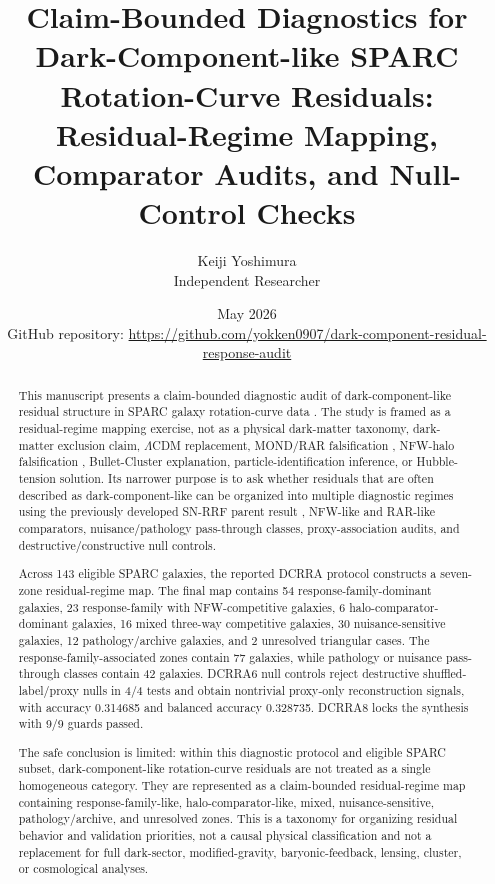 \documentclass[11pt,a4paper]{article}
\title{Claim-Bounded Diagnostics for Dark-Component-like SPARC Rotation-Curve Residuals:\\
Residual-Regime Mapping, Comparator Audits, and Null-Control Checks}
\author{Keiji Yoshimura\\Independent Researcher}
\date{May 2026\\\vspace{0.5em}\small GitHub repository: \url{https://github.com/yokken0907/dark-component-residual-response-audit}}
\begin{document}
\maketitle

\begin{abstract}
This manuscript presents a claim-bounded diagnostic audit of dark-component-like residual structure in SPARC galaxy rotation-curve data \cite{lelli2016}. The study is framed as a residual-regime mapping exercise, not as a physical dark-matter taxonomy, dark-matter exclusion claim, $\Lambda$CDM replacement, MOND/RAR falsification \cite{milgrom1983,mcgaugh2016}, NFW-halo falsification \cite{nfw1997}, Bullet-Cluster explanation, particle-identification inference, or Hubble-tension solution. Its narrower purpose is to ask whether residuals that are often described as dark-component-like can be organized into multiple diagnostic regimes using the previously developed SN-RRF parent result \cite{yoshimura2026snrrf}, NFW-like and RAR-like comparators, nuisance/pathology pass-through classes, proxy-association audits, and destructive/constructive null controls.

Across 143 eligible SPARC galaxies, the reported DCRRA protocol constructs a seven-zone residual-regime map. The final map contains 54 response-family-dominant galaxies, 23 response-family with NFW-competitive galaxies, 6 halo-comparator-dominant galaxies, 16 mixed three-way competitive galaxies, 30 nuisance-sensitive galaxies, 12 pathology/archive galaxies, and 2 unresolved triangular cases. The response-family-associated zones contain 77 galaxies, while pathology or nuisance pass-through classes contain 42 galaxies. DCRRA6 null controls reject destructive shuffled-label/proxy nulls in 4/4 tests and obtain nontrivial proxy-only reconstruction signals, with accuracy 0.314685 and balanced accuracy 0.328735. DCRRA8 locks the synthesis with 9/9 guards passed.

The safe conclusion is limited: within this diagnostic protocol and eligible SPARC subset, dark-component-like rotation-curve residuals are not treated as a single homogeneous category. They are represented as a claim-bounded residual-regime map containing response-family-like, halo-comparator-like, mixed, nuisance-sensitive, pathology/archive, and unresolved zones. This is a taxonomy for organizing residual behavior and validation priorities, not a causal physical classification and not a replacement for full dark-sector, modified-gravity, baryonic-feedback, lensing, cluster, or cosmological analyses.
\end{abstract}
\end{document}

